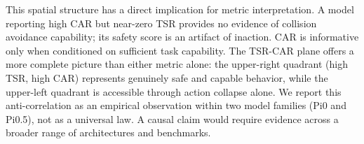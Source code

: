 This spatial structure has a direct implication for metric interpretation. A model reporting high CAR but near-zero TSR provides no evidence of collision avoidance capability; its safety score is an artifact of inaction. CAR is informative only when conditioned on sufficient task capability. The TSR-CAR plane offers a more complete picture than either metric alone: the upper-right quadrant (high TSR, high CAR) represents genuinely safe and capable behavior, while the upper-left quadrant is accessible through action collapse alone. We report this anti-correlation as an empirical observation within two model families (Pi0 and Pi0.5), not as a universal law. A causal claim would require evidence across a broader range of architectures and benchmarks.
